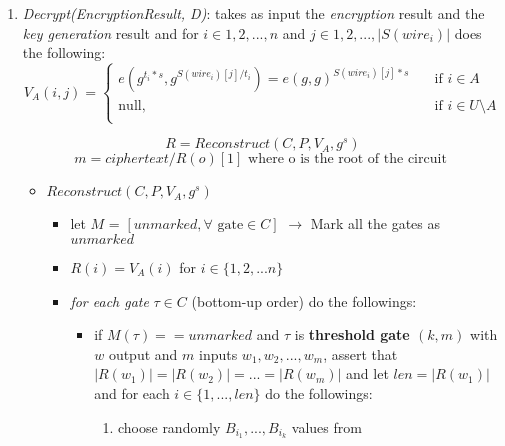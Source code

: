 \documentclass[12pt]{article}
\begin{document}
\begin{enumerate}
\begin{itemize}
\begin{itemize}
\begin{itemize}
				\end{itemize} 
			\end{itemize}
		\end{itemize}
	\item \textit{Decrypt(EncryptionResult, D)}: takes as input the \textit{encryption} result and the \textit{key generation} result and  for $i \in {1, 2, ...,n}$ and $j \in {1, 2, ..., |S(wire_i)|}$ does the following:
        \[   
        V_A(i,j) = 
             \begin{cases}
               e(g^{t_i*s}, g^{S(wire_i)[j] / t_i}) = e(g, g) ^{ S(wire_i)[j]*s}  &\quad\text{if } i \in A\\
               \text{null,} &\quad \text{if } i \in U \setminus A \\
             \end{cases}
        \]

        $$R = Reconstruct(C, P, V_A, g^s)$$
        $$m = ciphertext / R(o)[1] \textrm{ where o is the root of the circuit }$$
        
		\begin{itemize}
			\item $Reconstruct(C, P, V_A, g^s)$
			\begin{itemize}
				\item let $M$ = $[unmarked, \forall \textrm{ gate} \in C]$ $\rightarrow$ Mark all the gates as $unmarked$
				\item $R(i) = V_A(i)$ for $i \in \{1, 2, ...n\}$
				\item \textit{for each gate} $\tau \in C$ (bottom-up order) do the followings:
				\begin{itemize}
				    \item if $M(\tau) == unmarked$ and $\tau$ is \textbf{threshold gate $(k, m)$} with $w$ output and $m$ inputs $w_1, w_2, ..., w_m$, assert that $|R(w_1)| = |R(w_2)| = ... = |R(w_m)|$ and let $len = |R(w_1)|$ and for each $i \in \{1, ..., len\}$ do the followings:
				    \begin{enumerate}
				        \item choose randomly $B_{i_1}, ..., B_{i_k}$ values from 
				        

\end{enumerate}
\end{itemize}
\end{itemize}
\end{itemize}
\end{enumerate}
\end{document}
